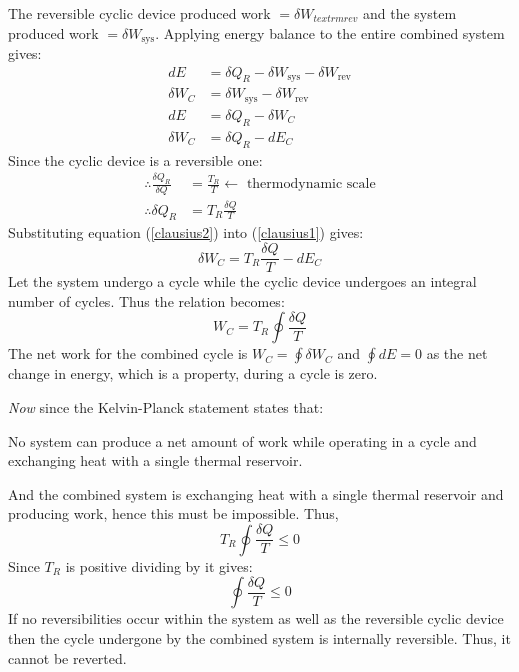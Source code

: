 The reversible cyclic device produced work \( = \delta W_{textrm{rev}}\) and the system produced work \( =\delta W_{\textrm{sys}} \). Applying energy balance to the entire combined system gives:
\begin{align}
  dE         & = \delta Q_R - \delta W_{\textrm{sys}} - \delta W_{\textrm{rev}} \\
  \delta W_C & = \delta W_{\textrm{sys}} - \delta W_{\textrm{rev}}              \\
  dE         & = \delta Q_R - \delta W_C                                        \\
  \delta W_C & = \delta Q_R - dE_C \label{clausius1}
\end{align}
Since the cyclic device is a reversible one:
\begin{align}
  \therefore \frac{\delta Q_R}{\delta Q} & = \frac{T_R}{T} \leftarrow \textrm{ thermodynamic scale} \\
  \therefore \delta Q_R                  & = T_R \frac{\delta Q}{T} \label{clausius2}
\end{align}
Substituting equation (\ref{clausius2}) into (\ref{clausius1}) gives:
\begin{equation}
  \delta W_C = T_R \frac{\delta Q}{T} - dE_C
\end{equation}
Let the system undergo a cycle while the cyclic device undergoes an integral number of cycles. Thus the relation becomes:
\begin{equation}
  W_C = T_R \oint \frac{\delta Q}{T}
\end{equation}
The net work for the combined cycle is \( W_C = \oint \delta W_C \) and \(\oint dE=0\) as the net change in energy, which is a property, during a cycle is zero.

\emph{Now} since the Kelvin-Planck statement states that:
\begin{center}
  No system can produce a net amount of work while operating in a cycle and exchanging heat with a single thermal reservoir.
\end{center}
And the combined system is exchanging heat with a single thermal reservoir and producing work, hence this must be impossible. Thus,
\begin{equation}
  T_R \oint \frac{\delta Q}{T} \leq 0
\end{equation}
Since \(T_R\) is positive dividing by it gives:
\begin{equation}
  \oint \frac{\delta Q}{T} \leq 0
\end{equation}
If no reversibilities occur within the system as well as the reversible cyclic device then the cycle undergone by the combined system is internally reversible. Thus, it cannot be reverted.

